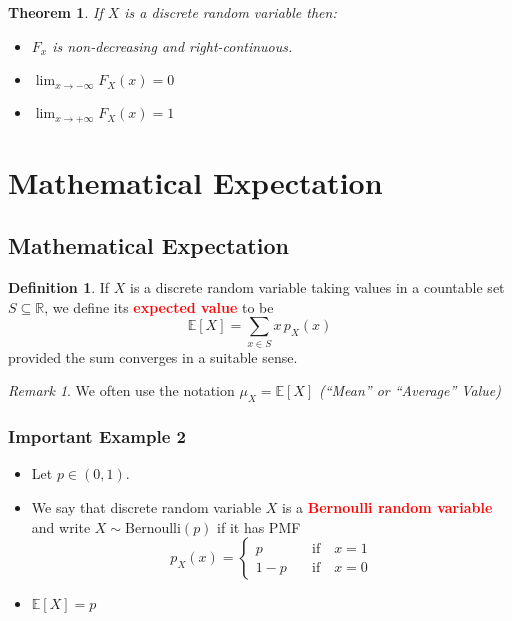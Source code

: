 \documentclass{article}
\newcommand{\R}{\mathbb{R}}
\newcommand{\E}{\mathbb{E}}
\newcommand{\bfred}[1]{\textcolor{red}{\textbf{#1}}}
\theoremstyle{plain}
\newtheorem{thm}{Theorem}[section]
\theoremstyle{definition}
\newtheorem{defn}{Definition}[section]
\theoremstyle{remark}
\newtheorem*{rem}{Remark}
\begin{document}
\begin{thm}
    If $X$ is a discrete random variable then:
    \begin{itemize}
        \item $F_x$ is non-decreasing and right-continuous.
        \item $\displaystyle\lim_{x \rightarrow -\infty} F_X(x) = 0$
        \item $\displaystyle\lim_{x \rightarrow +\infty} F_X(x) = 1$
    \end{itemize}
\end{thm}

\section{Mathematical Expectation}

\subsection{Mathematical Expectation}

\begin{defn}
    If $X$ is a discrete random variable taking values in a countable set $S \subseteq \R$, we define its \bfred{expected value} to be \[\E[X] = \sum_{x \in S} x\,p_X(x)\] provided the sum converges in a suitable sense.
\end{defn}

\begin{rem}
    We often use the notation $\mu_X = \E[X]$ \emph{(``Mean'' or ``Average'' Value)}
\end{rem}

\subsubsection*{Important Example 2}

\begin{tcolorbox}[title = Bernoulli Random Variable, colback = SkyBlue!5!white,colframe = SkyBlue!75!black]
    \begin{itemize}
        \item Let $p \in (0, 1)$.
        \item We say that  discrete random variable $X$ is a \bfred{Bernoulli random variable} and write $X \sim \text{Bernoulli}(p)$ if it has PMF \[p_X(x) =
        \begin{cases}
            p \quad &\text{if} \quad x = 1 \\
            1- p \quad &\text{if} \quad x = 0
        \end{cases}\]
        \item $\E[X] = p$
    \end{itemize}
\end{tcolorbox}
\end{document}
